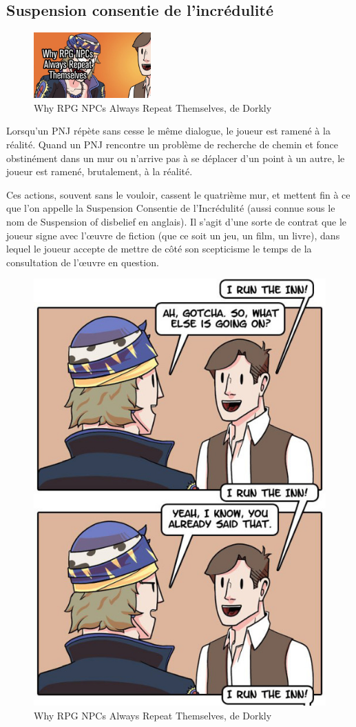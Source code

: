 \documentclass[a4paper, 12pt]{article} %
\begin{document}
\newpage

\subsection{Suspension consentie de l'incrédulité}

\begin{figure}
	\begin{center}
		\includegraphics[width=0.40\textwidth]{images/repeat1.png}
	\end{center}
	\caption{Why RPG NPCs Always Repeat Themselves, de Dorkly}
\end{figure}

Lorsqu’un PNJ répète sans cesse le même dialogue, le joueur est ramené à la réalité. Quand un PNJ rencontre un problème de recherche de chemin et fonce obstinément dans un mur ou n’arrive pas à se déplacer d’un point à un autre, le joueur est ramené, brutalement, à la réalité. 

Ces actions, souvent sans le vouloir, cassent le quatrième mur, et mettent fin à ce que l’on appelle la Suspension Consentie de l’Incrédulité (aussi connue sous le nom de Suspension of disbelief en anglais). Il s’agit d’une sorte de contrat que le joueur signe avec l’œuvre de fiction (que ce soit un jeu, un film, un livre), dans lequel le joueur accepte de mettre de côté son scepticisme le temps de la consultation de l’œuvre en question. 

\begin{figure}[!h]%
	\begin{center} 
		\includegraphics[width=0.40\columnwidth]{images/repeat2.png}%
		\caption{Why RPG NPCs Always Repeat Themselves, de Dorkly}%
	\end{center}
\end{figure}
\end{document}

